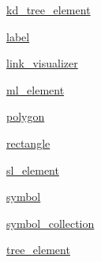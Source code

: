 \begin{DoxyCompactItemize}
\item 
 \mbox{\hyperlink{namespace_bridges_1_1kd__tree__element}{kd\+\_\+tree\+\_\+element}}
\item 
 \mbox{\hyperlink{namespace_bridges_1_1label}{label}}
\item 
 \mbox{\hyperlink{namespace_bridges_1_1link__visualizer}{link\+\_\+visualizer}}
\item 
 \mbox{\hyperlink{namespace_bridges_1_1ml__element}{ml\+\_\+element}}
\item 
 \mbox{\hyperlink{namespace_bridges_1_1polygon}{polygon}}
\item 
 \mbox{\hyperlink{namespace_bridges_1_1rectangle}{rectangle}}
\item 
 \mbox{\hyperlink{namespace_bridges_1_1sl__element}{sl\+\_\+element}}
\item 
 \mbox{\hyperlink{namespace_bridges_1_1symbol}{symbol}}
\item 
 \mbox{\hyperlink{namespace_bridges_1_1symbol__collection}{symbol\+\_\+collection}}
\item 
 \mbox{\hyperlink{namespace_bridges_1_1tree__element}{tree\+\_\+element}}
\end{DoxyCompactItemize}
